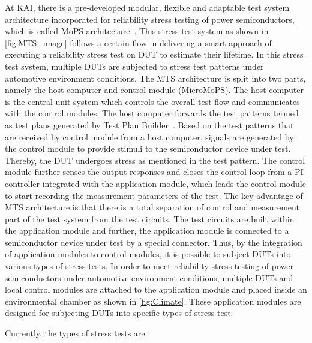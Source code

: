 At KAI, there is a pre-developed modular, flexible and adaptable test system architecture incorporated for reliability stress testing of power semiconductors, which is called \gls{MoPS} architecture~\cite{Steinwender2016}.
This stress test system as shown in \cref{fig:MTS_image} follows a certain flow in delivering a smart approach of executing a reliability stress test on \acrshort{DUT} to estimate their lifetime.
In this stress test system, multiple \acrshort{DUT}s are subjected to stress test patterns under automotive environment conditions.
The MTS architecture is split into two parts, namely the host computer and control module (MicroMoPS). 
The host computer is the central unit system which controls the overall test flow and communicates with the control modules. 
The host computer forwards the test patterns termed as test plans generated by Test Plan Builder~\cite{Plankensteiner2015}. 
Based on the test patterns that are received by control module from a host computer, signals are generated by the control module to provide stimuli to the semiconductor device under test. 
Thereby, the DUT undergoes stress as mentioned in the test pattern. 
The control module further senses the output responses and closes the control loop from a PI controller integrated with the application module, which leads the control module to start recording the measurement parameters of the test. 
The key advantage of \acrshort{MTS} architecture is that there is a total separation of control and measurement part of the test system from the test circuits. 
The test circuits are built within the application module and further, the application module is connected to a semiconductor device under test by a special connector. 
Thus, by the integration of application modules to control modules, it is possible to subject \acrshort{DUT}s into various types of stress tests. 
In order to meet reliability stress testing of power semiconductors under automotive environment conditions, multiple \acrshort{DUT}s and local control modules are attached to the application module and placed inside an environmental chamber as shown in \cref{fig:Climate}. 
These application modules are designed for subjecting \acrshort{DUT}s into specific types of stress test.

Currently, the types of stress tests are:  

